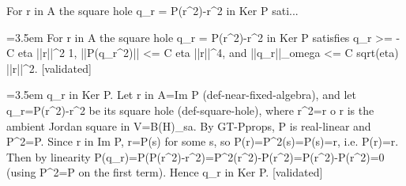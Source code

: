 \documentclass{article}
\newcommand{\step}[1]{\par\noindent\hangindent=3.5em\hangafter=1%
  \makebox[3.5em][l]{\textbf{#1.}}}
\newcommand{\steptag}[1]{\hfill{\small\textsf{[#1]}}}
\begin{document}
\begin{proofbox}{For r in A the square hole q\_r = P(r\textasciicircum{}2)-r\textasciicircum{}2 in Ker P sati...}
\step{1} For r in A the square hole q\_r = P(r\textasciicircum{}2)-r\textasciicircum{}2 in Ker P satisfies q\_r >= -C eta ||r||\textasciicircum{}2 1, ||P(q\_r\textasciicircum{}2)|| <= C eta ||r||\textasciicircum{}4, and ||q\_r||\_omega <= C sqrt(eta) ||r||\textasciicircum{}2. \steptag{validated} \\[6pt]
\step{1.1} q\_r in Ker P. Let r in A=Im P (def-near-fixed-algebra), and let q\_r=P(r\textasciicircum{}2)-r\textasciicircum{}2 be its square hole (def-square-hole), where r\textasciicircum{}2=r o r is the ambient Jordan square in V=B(H)\_sa. By GT-Pprops, P is real-linear and P\textasciicircum{}2=P. Since r in Im P, r=P(s) for some s, so P(r)=P\textasciicircum{}2(s)=P(s)=r, i.e. P(r)=r. Then by linearity P(q\_r)=P(P(r\textasciicircum{}2)-r\textasciicircum{}2)=P\textasciicircum{}2(r\textasciicircum{}2)-P(r\textasciicircum{}2)=P(r\textasciicircum{}2)-P(r\textasciicircum{}2)=0 (using P\textasciicircum{}2=P on the first term). Hence q\_r in Ker P. \steptag{validated} \\[4pt]

\end{proofbox}
\end{document}
